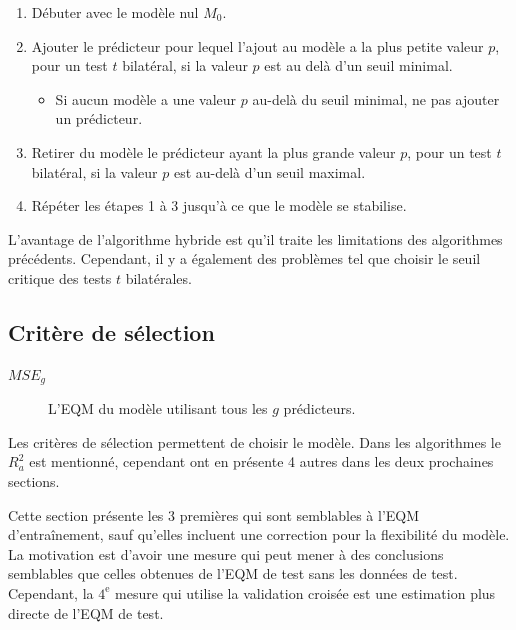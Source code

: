 \documentclass[french]{article}
\begin{document}
\begin{multicols*}{2}
\begin{algo2}
\begin{enumerate}[label = \circled{\arabic*}{trueblue}]
	\item	Débuter avec le modèle nul $M_{0}$.
	\item	Ajouter le prédicteur pour lequel l'ajout au modèle a la plus petite valeur $p$, pour un test $t$ bilatéral, si la valeur $p$ est au delà d'un seuil minimal.
		\begin{itemize}
		\item	Si aucun modèle a une valeur $p$ au-delà du seuil minimal, ne pas ajouter un prédicteur.
		\end{itemize}
	\item	Retirer du modèle le prédicteur ayant la plus grande valeur $p$, pour un test $t$ bilatéral, si la valeur $p$ est au-delà d'un seuil maximal.
	\item	Répéter les étapes 1 à 3 jusqu'à ce que le modèle se stabilise.
\end{enumerate}
\end{algo2}

\begin{rappel_enhanced}[Contexte]
L'avantage de l'algorithme hybride est qu'il traite les limitations des algorithmes précédents. Cependant, il y a également des problèmes tel que choisir le seuil critique des tests $t$ bilatérales.
\end{rappel_enhanced}




\columnbreak
\subsection{Critère de sélection}\label{subsec:modSelCrit}
\begin{distributions}[Notation]
\begin{description}
	\item[$MSE_{g}$]	L'EQM du modèle utilisant tous les $g$ prédicteurs.
\end{description}
\end{distributions}
\begin{rappel_enhanced}[Contexte]
Les critères de sélection permettent de choisir le modèle. Dans les algorithmes le $R^{2}_{a}$ est mentionné, cependant ont en présente 4 autres dans les deux prochaines sections. 

\bigskip

Cette section présente les 3 premières qui sont semblables à l'EQM d'entraînement, sauf qu'elles incluent une correction pour la flexibilité du modèle. La motivation est d'avoir une mesure qui peut mener à des conclusions semblables que celles obtenues de l'EQM de test sans les données de test. Cependant, la $4^{\text{e}}$ mesure qui utilise la validation croisée est une estimation plus directe de l'EQM de test.
\end{rappel_enhanced}


\end{multicols*}
\end{document}
